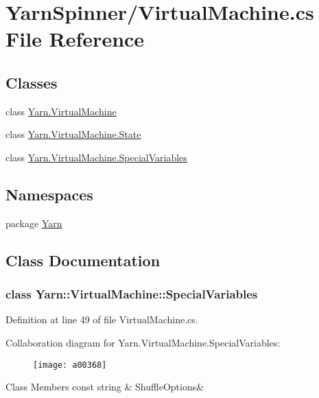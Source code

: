 \hypertarget{a00294}{\section{Yarn\-Spinner/\-Virtual\-Machine.cs File Reference}
\label{a00294}
}
\subsection*{Classes}
\begin{DoxyCompactItemize}
\item 
class \hyperlink{a00147}{Yarn.\-Virtual\-Machine}
\item 
class \hyperlink{a00150}{Yarn.\-Virtual\-Machine.\-State}
\item 
class \hyperlink{a00147_a00356}{Yarn.\-Virtual\-Machine.\-Special\-Variables}
\end{DoxyCompactItemize}
\subsection*{Namespaces}
\begin{DoxyCompactItemize}
\item 
package \hyperlink{a00050}{Yarn}
\end{DoxyCompactItemize}


\subsection{Class Documentation}
\label{a00356}
\hypertarget{a00147_a00356}{}
\subsubsection{class Yarn\-:\-:Virtual\-Machine\-:\-:Special\-Variables}


Definition at line 49 of file Virtual\-Machine.\-cs.



Collaboration diagram for Yarn.\-Virtual\-Machine.\-Special\-Variables\-:
\nopagebreak
\begin{figure}[H]
\begin{center}
\leavevmode
\texttt{[image: a00368]}
\end{center}
\end{figure}
\begin{DoxyFields}{Class Members}
\hypertarget{a00147_aecbb8ab9becd96457d836100b2818078}{const string}\label{a00147_aecbb8ab9becd96457d836100b2818078}
&
Shuffle\-Options&
\\
\hline

\end{DoxyFields}
